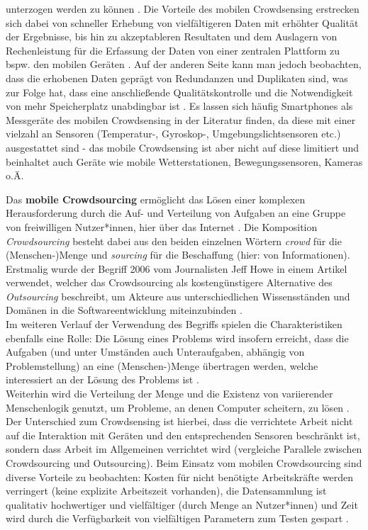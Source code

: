 unterzogen werden zu können \cite{Ray2022}. Die Vorteile des mobilen Crowdsensing erstrecken sich dabei von schneller Erhebung von vielfältigeren Daten mit erhöhter Qualität der Ergebnisse, bis hin zu akzeptableren Resultaten und dem Auslagern von Rechenleistung für die Erfassung der Daten von einer zentralen Plattform zu bspw. den mobilen Geräten \cite{Ray2022}. Auf der anderen Seite kann man jedoch beobachten, dass die erhobenen Daten geprägt von Redundanzen und Duplikaten sind, was zur Folge hat, dass eine anschließende Qualitätskontrolle und die Notwendigkeit von mehr Speicherplatz unabdingbar ist \cite{Ray2022}. Es lassen sich häufig Smartphones als Messgeräte des mobilen Crowdsensing in der Literatur finden, da diese mit einer vielzahl an Sensoren (Temperatur-, Gyroskop-, Umgebungslichtsensoren etc.) ausgestattet sind - das mobile Crowdsensing ist aber nicht auf diese limitiert und beinhaltet auch Geräte wie mobile Wetterstationen, Bewegungssensoren, Kameras o.Ä.


Das \textbf{mobile Crowdsourcing} ermöglicht das Lösen einer komplexen Herausforderung durch die Auf- und Verteilung von Aufgaben an eine Gruppe von freiwilligen Nutzer*innen, hier über das Internet \cite {Wang2019}. Die Komposition \textit{Crowdsourcing} besteht dabei aus den beiden einzelnen Wörtern \textit{crowd} für die (Menschen-)Menge und \textit{sourcing} für die Beschaffung (hier: von Informationen). Erstmalig wurde der Begriff 2006 vom Journalisten Jeff Howe in einem Artikel verwendet, welcher das Crowdsourcing als kostengünstigere Alternative des \textit{Outsourcing} beschreibt, um Akteure aus unterschiedlichen Wissensständen und Domänen in die Softwareentwicklung miteinzubinden \cite{Howe2006}. \\ Im weiteren Verlauf der Verwendung des Begriffs spielen die Charakteristiken ebenfalls eine Rolle: Die Lösung eines Problems wird insofern erreicht, dass die Aufgaben (und unter Umständen auch Unteraufgaben, abhängig von Problemstellung) an eine (Menschen-)Menge übertragen werden, welche interessiert an der Lösung des Problems ist \cite{Ray2022}. \\ Weiterhin wird die Verteilung der Menge und die Existenz von variierender Menschenlogik genutzt, um Probleme, an denen Computer scheitern, zu lösen \cite{Ray2022}. Der Unterschied zum Crowdsensing ist hierbei, dass die verrichtete Arbeit nicht auf die Interaktion mit Geräten und den entsprechenden Sensoren beschränkt ist, sondern dass Arbeit im Allgemeinen verrichtet wird (vergleiche Parallele zwischen Crowdsourcing und Outsourcing). Beim Einsatz vom mobilen Crowdsourcing sind diverse Vorteile zu beobachten: Kosten für nicht benötigte Arbeitskräfte werden verringert (keine explizite Arbeitszeit vorhanden), die Datensammlung ist qualitativ hochwertiger und vielfältiger (durch Menge an Nutzer*innen) und Zeit wird durch die Verfügbarkeit von vielfältigen Parametern zum Testen gespart \cite{Ray2022}.


